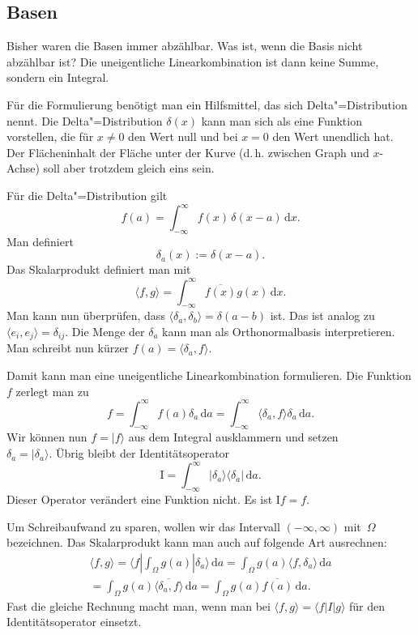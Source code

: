 \documentclass[a4paper,11pt,fleqn,twocolumn,twoside]{scrartcl}
\numberwithin{equation}{section}
\begin{document}
\subsection{Basen}

Bisher waren die Basen immer abzählbar. Was ist, wenn die Basis nicht
abzählbar ist? Die uneigentliche Linearkombination ist dann keine
Summe, sondern ein Integral.

Für die Formulierung benötigt man ein Hilfsmittel, das sich
Delta"=Distribution nennt. Die Delta"=Distribution $\delta(x)$ kann man
sich als eine Funktion vorstellen, die für $x\ne 0$ den Wert null
und bei $x=0$ den Wert unendlich hat. Der Flächeninhalt der Fläche
unter der Kurve (d.\,h. zwischen Graph und $x$-Achse) soll aber
trotzdem gleich eins sein.

Für die Delta"=Distribution gilt
\begin{equation}
f(a) = \int_{-\infty}^{\infty} f(x)\,\delta(x-a)\,\mathrm dx.
\end{equation}
Man definiert
\begin{equation}
\delta_a(x) := \delta(x-a).
\end{equation}
Das Skalarprodukt definiert man mit
\begin{equation}
\langle f,g\rangle
= \int_{-\infty}^{\infty} \overline{f(x)}g(x)\,\mathrm dx.
\end{equation}
Man kann nun überprüfen, dass
$\langle\delta_a,\delta_b\rangle=\delta(a-b)$ ist. Das ist analog
zu $\langle e_i,e_j\rangle = \delta_{ij}$. Die Menge der
$\delta_a$ kann man als Orthonormalbasis interpretieren.
Man schreibt nun kürzer $f(a) = \langle\delta_a,f\rangle$.

Damit kann man eine uneigentliche Linearkombination formulieren.
Die Funktion $f$ zerlegt man zu
\begin{equation}
f = \int_{-\infty}^{\infty} f(a)\delta_a\,\mathrm da
= \int_{-\infty}^{\infty} \langle\delta_a,f\rangle\delta_a\,\mathrm da.
\end{equation}
Wir können nun $f=|f\rangle$ aus dem Integral ausklammern und setzen\\
$\delta_a = |\delta_a\rangle$.
Übrig bleibt der Identitätsoperator
\begin{equation}
\mathrm I
= \int_{-\infty}^{\infty} |\delta_a\rangle\langle\delta_a|\,\mathrm da.
\end{equation}
Dieser Operator verändert eine Funktion nicht. Es ist $\mathrm If=f$.

Um Schreibaufwand zu sparen, wollen wir das Intervall
$(-\infty,\infty)$ mit~$\Omega$ bezeichnen. Das Skalarprodukt
kann man auch auf folgende Art ausrechnen:
\begin{gather*}
\langle f,g\rangle = \langle f|\int_{\Omega} g(a)|\delta_a\rangle\,\mathrm da
= \int_{\Omega} g(a)\langle f,\delta_a\rangle\,\mathrm da\\
= \int_{\Omega} g(a)\overline{\langle\delta_a,f\rangle}\,\mathrm da
= \int_{\Omega} g(a)\overline{f(a)}\,\mathrm da.
\end{gather*}
Fast die gleiche Rechnung macht man, wenn man bei
$\langle f,g\rangle=\langle f|I|g\rangle$ für den
Identitätsoperator einsetzt.
\end{document}
